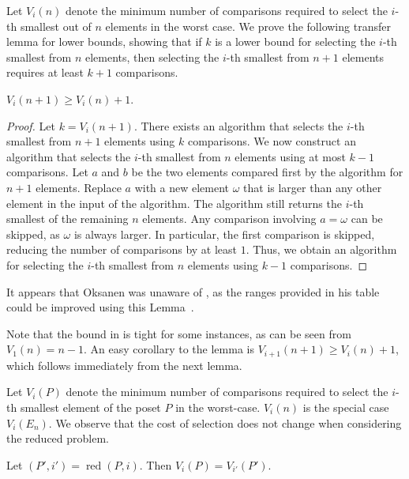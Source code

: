 \documentclass[a4paper,UKenglish,cleveref, autoref, thm-restate, anonymous]{lipics-v2021}
\newcommand{\reduced}[1]{\operatorname{red}#1}
\begin{document}
Let $V_i(n)$ denote the minimum number of comparisons required to select the $i$-th smallest out of $n$ elements in the worst case.
We prove the following transfer lemma for lower bounds, showing that if $k$ is a lower bound for selecting the $i$-th smallest from $n$ elements, then selecting the $i$-th smallest from $n + 1$ elements requires at least $k + 1$ comparisons.

\begin{lemma} \label{lemma:previous_next_poset}
  $V_i(n + 1) \geq V_i(n) + 1$.
\end{lemma}

\begin{proof}
  Let $k = V_i(n + 1)$.
  There exists an algorithm that selects the $i$-th smallest from $n + 1$ elements using $k$ comparisons.
  We now construct an algorithm that selects the $i$-th smallest from $n$ elements using at most $k - 1$ comparisons.
  Let $a$ and $b$ be the two elements compared first by the algorithm for $n + 1$ elements.
  Replace $a$ with a new element $\omega$ that is larger than any other element in the input of the algorithm.
  The algorithm still returns the $i$-th smallest of the remaining $n$ elements.
  Any comparison involving $a = \omega$ can be skipped, as $\omega$ is always larger.
  In particular, the first comparison is skipped, reducing the number of comparisons by at least $1$.
  Thus, we obtain an algorithm for selecting the $i$-th smallest from $n$ elements using $k - 1$ comparisons.
\end{proof}

\begin{remark}
  It appears that Oksanen was unaware of , as the ranges provided in his table could be improved using this Lemma~\cite{Oksanen}.
\end{remark}

Note that the bound in  is tight for some instances, as can be seen from $V_1(n) = n - 1$.
An easy corollary to the lemma is $V_{i + 1}(n + 1) \geq V_i(n) + 1$, which follows immediately from the next lemma.

Let $V_i(P)$ denote the minimum number of comparisons required to select the $i$-th smallest element of the poset $P$ in the worst-case.
$V_i(n)$ is the special case $V_i(E_n)$.
We observe that the cost of selection does not change when considering the reduced problem.

\begin{observation}
  Let $(P', i') = \reduced{(P, i)}$.
  Then $V_i(P) = V_{i'}(P')$.
\end{observation}
\end{document}
